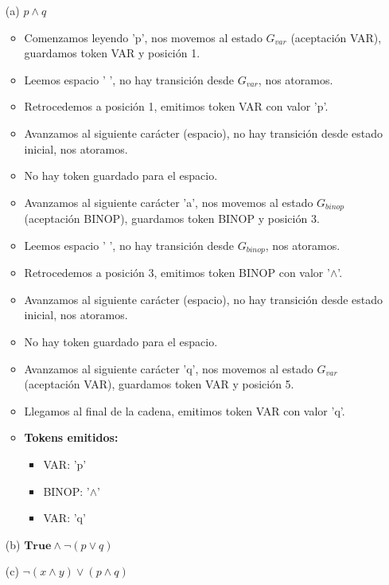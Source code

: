 \begin{enumerate}
    \item[(a)] $p \land q$
    
    \begin{itemize}
        \item Comenzamos leyendo 'p', nos movemos al estado $G_{var}$ (aceptación VAR), guardamos token VAR y posición 1.
        \item Leemos espacio ' ', no hay transición desde $G_{var}$, nos atoramos.
        \item Retrocedemos a posición 1, emitimos token VAR con valor 'p'.
        \item Avanzamos al siguiente carácter (espacio), no hay transición desde estado inicial, nos atoramos.
        \item No hay token guardado para el espacio.
        \item Avanzamos al siguiente carácter 'a', nos movemos al estado $G_{binop}$ (aceptación BINOP), guardamos token BINOP y posición 3.
        \item Leemos espacio ' ', no hay transición desde $G_{binop}$, nos atoramos.
        \item Retrocedemos a posición 3, emitimos token BINOP con valor '$\land$'.
        \item Avanzamos al siguiente carácter (espacio), no hay transición desde estado inicial, nos atoramos.
        \item No hay token guardado para el espacio.
        \item Avanzamos al siguiente carácter 'q', nos movemos al estado $G_{var}$ (aceptación VAR), guardamos token VAR y posición 5.
        \item Llegamos al final de la cadena, emitimos token VAR con valor 'q'.
    \item \textbf{Tokens emitidos:}
        \begin{itemize}
            \item VAR: 'p'
            \item BINOP: '$\land$'
            \item VAR: 'q'
        \end{itemize}
    \end{itemize}


    \item[(b)] $\textbf{True} \land \lnot(p \lor q)$
    \item[(c)] $\lnot(x \land y) \lor (p \land q)$
\end{enumerate}